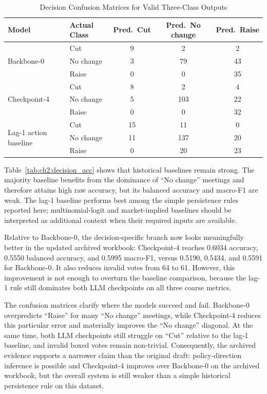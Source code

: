 \begin{table}[htbp]
    \centering
    \scriptsize
    \begin{tabular}{l l c c c}
        \toprule
        \textbf{Model} & \textbf{Actual Class} & \textbf{Pred.\ Cut} & \textbf{Pred.\ No change} & \textbf{Pred.\ Raise} \\
        \midrule
        \multirow{3}{*}{Backbone-0}
            & Cut & 9 & 2 & 2 \\
            & No change & 3 & 79 & 43 \\
            & Raise & 0 & 0 & 35 \\
        \midrule
        \multirow{3}{*}{Checkpoint-4}
            & Cut & 8 & 2 & 4 \\
            & No change & 5 & 103 & 22 \\
            & Raise & 0 & 0 & 32 \\
        \midrule
        \multirow{3}{*}{Lag-1 action baseline}
            & Cut & 15 & 11 & 0 \\
            & No change & 11 & 137 & 20 \\
            & Raise & 0 & 20 & 23 \\
        \bottomrule
    \end{tabular}
    \caption{Decision Confusion Matrices for Valid Three-Class Outputs}
    \label{tab:ch2:decision_confusion}
\end{table}

Table~\ref{tab:ch2:decision_acc} shows that historical baselines remain strong. The majority baseline benefits from the dominance of ``No change'' meetings and therefore attains high raw accuracy, but its balanced accuracy and macro-F1 are weak. The lag-1 baseline performs best among the simple persistence rules reported here; multinomial-logit and market-implied baselines should be interpreted as additional context when their required inputs are available.

Relative to Backbone-0, the decision-specific branch now looks meaningfully better in the updated archived workbook: Checkpoint-4 reaches 0.6034 accuracy, 0.5550 balanced accuracy, and 0.5995 macro-F1, versus 0.5190, 0.5434, and 0.5591 for Backbone-0. It also reduces invalid votes from 64 to 61. However, this improvement is not enough to overturn the baseline comparison, because the lag-1 rule still dominates both LLM checkpoints on all three coarse metrics.

The confusion matrices clarify where the models succeed and fail. Backbone-0 overpredicts ``Raise'' for many ``No change'' meetings, while Checkpoint-4 reduces this particular error and materially improves the ``No change'' diagonal. At the same time, both LLM checkpoints still struggle on ``Cut'' relative to the lag-1 baseline, and invalid boxed votes remain non-trivial. Consequently, the archived evidence supports a narrower claim than the original draft: policy-direction inference is possible and Checkpoint-4 improves over Backbone-0 on the archived workbook, but the overall system is still weaker than a simple historical persistence rule on this dataset.

